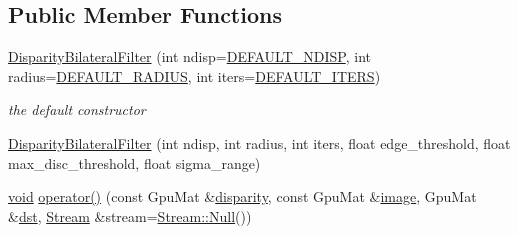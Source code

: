 \subsection*{Public Member Functions}
\begin{DoxyCompactItemize}
\item 
\hyperlink{classcv_1_1gpu_1_1DisparityBilateralFilter_aee39c542701a7511ad5c2be08f51f94d}{Disparity\-Bilateral\-Filter} (int ndisp=\hyperlink{classcv_1_1gpu_1_1DisparityBilateralFilter_a63ac0856feae5097af3ff4e36addebcdaf836d97561d11485f55798919244662d}{D\-E\-F\-A\-U\-L\-T\-\_\-\-N\-D\-I\-S\-P}, int radius=\hyperlink{classcv_1_1gpu_1_1DisparityBilateralFilter_a9425d7ecb0640b4155376a55f4be8fe2a4d67e68ea06c6e8c17538039d92371b2}{D\-E\-F\-A\-U\-L\-T\-\_\-\-R\-A\-D\-I\-U\-S}, int iters=\hyperlink{classcv_1_1gpu_1_1DisparityBilateralFilter_ac8df35acbf75dd8638f9dae2c1ab750da86aa9f9a5e2905c7adc57c6d479f91d9}{D\-E\-F\-A\-U\-L\-T\-\_\-\-I\-T\-E\-R\-S})
\begin{DoxyCompactList}\small\item\em the default constructor \end{DoxyCompactList}\item 
\hyperlink{classcv_1_1gpu_1_1DisparityBilateralFilter_a6552806631ea5ef9b18ab12f2ac8270f}{Disparity\-Bilateral\-Filter} (int ndisp, int radius, int iters, float edge\-\_\-threshold, float max\-\_\-disc\-\_\-threshold, float sigma\-\_\-range)
\item 
\hyperlink{legacy_8hpp_a8bb47f092d473522721002c86c13b94e}{void} \hyperlink{classcv_1_1gpu_1_1DisparityBilateralFilter_a7267c537f4558687730a1e967246b2f8}{operator()} (const Gpu\-Mat \&\hyperlink{calib3d_8hpp_acd2ef073a3a4984e0a0ebac5c7e179fd}{disparity}, const Gpu\-Mat \&\hyperlink{legacy_8hpp_ad62b16ab219ae2483e8a3d921c44cc97}{image}, Gpu\-Mat \&\hyperlink{photo__c_8h_aed13e2a25279b24dc954073233fef7a5}{dst}, \hyperlink{classcv_1_1gpu_1_1Stream}{Stream} \&stream=\hyperlink{classcv_1_1gpu_1_1Stream_af96c23564834f88333dcb8997df553f1}{Stream\-::\-Null}())
\end{DoxyCompactItemize}


